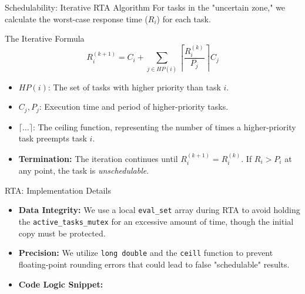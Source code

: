 \begin{frame}{Schedulability: Iterative RTA Algorithm}
    For tasks in the "uncertain zone," we calculate the worst-case response time ($R_i$) for each task.
    \begin{block}{The Iterative Formula}
        \[ R_i^{(k+1)} = C_i + \sum_{j \in HP(i)} \left\lceil \frac{R_i^{(k)}}{P_j} \right\rceil C_j \]
    \end{block}
    \begin{itemize}
        \item $HP(i)$: The set of tasks with higher priority than task $i$.
        \item $C_j, P_j$: Execution time and period of higher-priority tasks.
        \item $\lceil \dots \rceil$: The ceiling function, representing the number of times a higher-priority task preempts task $i$.
        \item \textbf{Termination:} The iteration continues until $R_i^{(k+1)} = R_i^{(k)}$. If $R_i > P_i$ at any point, the task is \textit{unschedulable}.
    \end{itemize}
\end{frame}

\begin{frame}{RTA: Implementation Details}
    \begin{itemize}
        \item \textbf{Data Integrity:} We use a local \texttt{eval\_set} array during RTA to avoid holding the \texttt{active\_tasks\_mutex} for an excessive amount of time, though the initial copy must be protected.
        \item \textbf{Precision:} We utilize \texttt{long double} and the \texttt{ceill} function to prevent floating-point rounding errors that could lead to false "schedulable" results.
        \item \textbf{Code Logic Snippet:}
    \end{itemize}
\end{frame}

